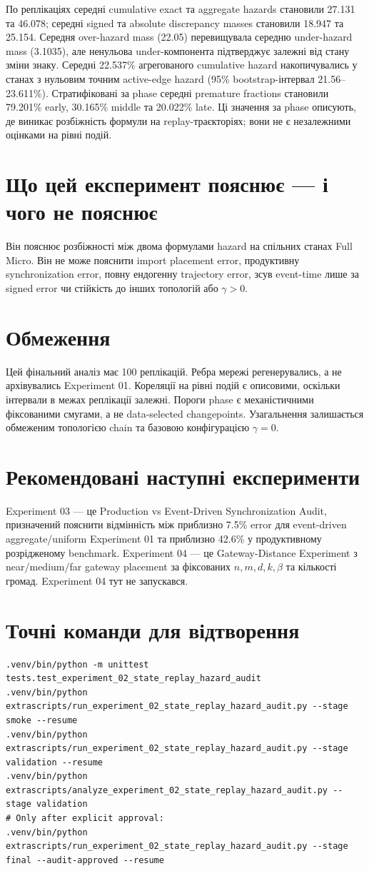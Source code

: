 \documentclass[11pt]{article}
\begin{document}
По реплікаціях середні cumulative exact та aggregate hazards становили 27.131 та 46.078; середні signed та absolute discrepancy masses становили 18.947 та 25.154. Середня over-hazard mass (22.05) перевищувала середню under-hazard mass (3.1035), але ненульова under-компонента підтверджує залежні від стану зміни знаку. Середні 22.537\% агрегованого cumulative hazard накопичувались у станах з нульовим точним active-edge hazard (95\% bootstrap-інтервал 21.56--23.611\%). Стратифіковані за phase середні premature fractions становили 79.201\% early, 30.165\% middle та 20.022\% late. Ці значення за phase описують, де виникає розбіжність формули на replay-траєкторіях; вони не є незалежними оцінками на рівні подій.

\section{Що цей експеримент пояснює --- і чого не пояснює}
Він пояснює розбіжності між двома формулами hazard на спільних станах Full Micro. Він не може пояснити import placement error, продуктивну synchronization error, повну ендогенну trajectory error, зсув event-time лише за signed error чи стійкість до інших топологій або $\gamma>0$.

\section{Обмеження}
Цей фінальний аналіз має 100 реплікацій. Ребра мережі регенерувались, а не архівувались Experiment 01. Кореляції на рівні подій є описовими, оскільки інтервали в межах реплікації залежні. Пороги phase є механістичними фіксованими смугами, а не data-selected changepoints. Узагальнення залишається обмеженим топологією chain та базовою конфігурацією $\gamma=0$.

\section{Рекомендовані наступні експерименти}
Experiment 03 --- це Production vs Event-Driven Synchronization Audit, призначений пояснити відмінність між приблизно 7.5\% error для event-driven aggregate/uniform Experiment 01 та приблизно 42.6\% у продуктивному розрідженому benchmark. Experiment 04 --- це Gateway-Distance Experiment з near/medium/far gateway placement за фіксованих $n,m,d,k,\beta$ та кількості громад. Experiment 04 тут не запускався.

\section{Точні команди для відтворення}
\begin{verbatim}
.venv/bin/python -m unittest tests.test_experiment_02_state_replay_hazard_audit
.venv/bin/python extrascripts/run_experiment_02_state_replay_hazard_audit.py --stage smoke --resume
.venv/bin/python extrascripts/run_experiment_02_state_replay_hazard_audit.py --stage validation --resume
.venv/bin/python extrascripts/analyze_experiment_02_state_replay_hazard_audit.py --stage validation
# Only after explicit approval:
.venv/bin/python extrascripts/run_experiment_02_state_replay_hazard_audit.py --stage final --audit-approved --resume
\end{verbatim}
\end{document}
